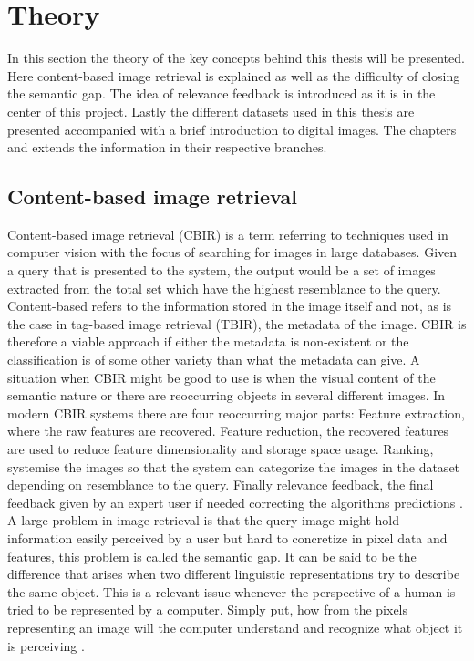 
\chapter{Theory}
\label{chapter:cbirtheory}
In this section the theory of the key concepts behind this thesis will be presented. Here content-based image retrieval is explained as well as the difficulty of closing the semantic gap. The idea of relevance feedback is introduced as it is in the center of this project. Lastly the different datasets used in this thesis are presented accompanied with a brief introduction to digital images. 
The chapters  and  extends the information in their respective branches.

\section{Content-based image retrieval}

Content-based image retrieval (CBIR) is a term referring to techniques used in computer vision with the focus of searching for images in large databases. Given a query that is presented to the system, the output would be a set of images extracted from the total set which have the highest resemblance to the query. Content-based refers to the information stored in the image itself and not, as is the case in tag-based image retrieval (TBIR), the metadata of the image. CBIR is therefore a viable approach if either the metadata is non-existent or the classification is of some other variety than what the metadata can give. A situation when CBIR might be good to use is when the visual content of the semantic nature or there are reoccurring objects in several different images. In modern CBIR systems there are four reoccurring major parts: Feature extraction, where the raw features are recovered. Feature reduction, the recovered features are used to reduce feature dimensionality and storage space usage. Ranking, systemise the images so that the system can categorize the images in the dataset depending on resemblance to the query. Finally relevance feedback, the final feedback given by an expert user if needed correcting the algorithms predictions \cite{kundu2015graph}. A large problem in image retrieval is that the query image might hold information easily perceived by a user but hard to concretize in pixel data and features, this problem is called the semantic gap. It can be said to be the difference that arises when two different linguistic representations try to describe the same object. This is a relevant issue whenever the perspective of a human is tried to be represented by a computer. Simply put, how from the pixels representing an image will the computer understand and recognize what object it is perceiving \cite{smeulders2000semantic} . 


